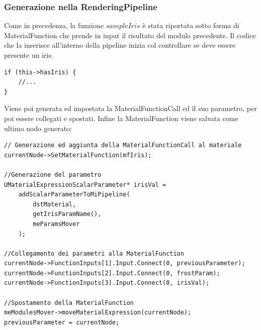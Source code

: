 \documentclass[main.tex]{subfiles}
\begin{document}
\subsubsection{Generazione nella RenderingPipeline}\label{subsec:5_2_IrisRenderingPipeline}
Come in precedenza, la funzione $sampleIris$ è stata riportata sotto forma di MaterialFunction che prende in input il risultato del modulo precedente. Il codice che la inserisce all'interno della pipeline inizia col controllare se deve essere presente un iris.
\begin{lstlisting}
if (this->hasIris) {
    //...
}
\end{lstlisting}

Viene poi generata ed impostata la MaterialFunctionCall ed il suo parametro, per poi essere collegati e spostati. Infine la MaterialFunction viene salvata come ultimo nodo generato:
\begin{lstlisting}
// Generazione ed aggiunta della MaterialFunctionCall al materiale
currentNode->SetMaterialFunction(mfIris);

//Generazione del parametro
UMaterialExpressionScalarParameter* irisVal =
    addScalarParameterToMiPipeline(
        dstMaterial,
        getIrisParamName(),
        meParamsMover
    );

//Collegamento dei parametri alla MaterialFunction
currentNode->FunctionInputs[1].Input.Connect(0, previousParameter);
currentNode->FunctionInputs[2].Input.Connect(0, frostParam);
currentNode->FunctionInputs[3].Input.Connect(0, irisVal);

//Spostamento della MaterialFunction
meModulesMover->moveMaterialExpression(currentNode);
previousParameter = currentNode;
\end{lstlisting}
\end{document}
